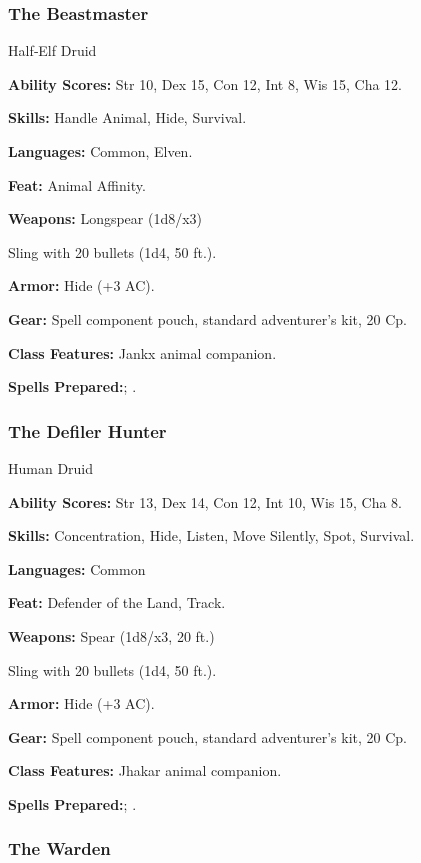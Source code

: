 \subsubsection{The Beastmaster}

Half‐Elf Druid

\textbf{Ability Scores:} Str 10, Dex 15, Con 12, Int 8, Wis 15, Cha 12.

\textbf{Skills:} Handle Animal, Hide, Survival.

\textbf{Languages:} Common, Elven.

\textbf{Feat:} Animal Affinity.

\textbf{Weapons:} Longspear (1d8/x3)

Sling with 20 bullets (1d4, 50 ft.).

\textbf{Armor:} Hide (+3 AC).

\textbf{Gear:} Spell component pouch, standard adventurer's kit, 20 Cp.

\textbf{Class Features:} Jankx animal companion.

\textbf{Spells Prepared:}; .

\subsubsection{The Defiler Hunter}

Human Druid

\textbf{Ability Scores:} Str 13, Dex 14, Con 12, Int 10, Wis 15, Cha 8.

\textbf{Skills:} Concentration, Hide, Listen, Move Silently, Spot, Survival.

\textbf{Languages:} Common

\textbf{Feat:} Defender of the Land, Track.

\textbf{Weapons:} Spear (1d8/x3, 20 ft.)

Sling with 20 bullets (1d4, 50 ft.).

\textbf{Armor:} Hide (+3 AC).

\textbf{Gear:} Spell component pouch, standard adventurer's kit, 20 Cp.

\textbf{Class Features:} Jhakar animal companion.

\textbf{Spells Prepared:};\hskip10pt .

\subsubsection{The Warden}

